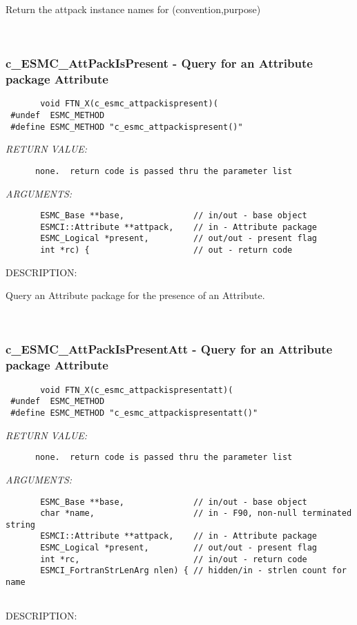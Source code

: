        Return the attpack instance names for (convention,purpose)
   
 
\mbox{}\hrulefill\ 
 
\subsubsection [c\_ESMC\_AttPackIsPresent] {c\_ESMC\_AttPackIsPresent - Query for an Attribute package Attribute}


  
\begin{verbatim}       void FTN_X(c_esmc_attpackispresent)(
 #undef  ESMC_METHOD
 #define ESMC_METHOD "c_esmc_attpackispresent()"\end{verbatim}{\em RETURN VALUE:}
\begin{verbatim}      none.  return code is passed thru the parameter list\end{verbatim}{\em ARGUMENTS:}
\begin{verbatim}       ESMC_Base **base,              // in/out - base object
       ESMCI::Attribute **attpack,    // in - Attribute package
       ESMC_Logical *present,         // out/out - present flag
       int *rc) {                     // out - return code
 \end{verbatim}
{\sf DESCRIPTION:\\ }


       Query an Attribute package for the presence of an Attribute.
   
 
\mbox{}\hrulefill\ 
 
\subsubsection [c\_ESMC\_AttPackIsPresentAtt] {c\_ESMC\_AttPackIsPresentAtt - Query for an Attribute package Attribute}


  
\begin{verbatim}       void FTN_X(c_esmc_attpackispresentatt)(
 #undef  ESMC_METHOD
 #define ESMC_METHOD "c_esmc_attpackispresentatt()"\end{verbatim}{\em RETURN VALUE:}
\begin{verbatim}      none.  return code is passed thru the parameter list
   \end{verbatim}{\em ARGUMENTS:}
\begin{verbatim}       ESMC_Base **base,              // in/out - base object
       char *name,                    // in - F90, non-null terminated string
       ESMCI::Attribute **attpack,    // in - Attribute package
       ESMC_Logical *present,         // out/out - present flag 
       int *rc,                       // in/out - return code
       ESMCI_FortranStrLenArg nlen) { // hidden/in - strlen count for name
 
   \end{verbatim}
{\sf DESCRIPTION:\\ }



